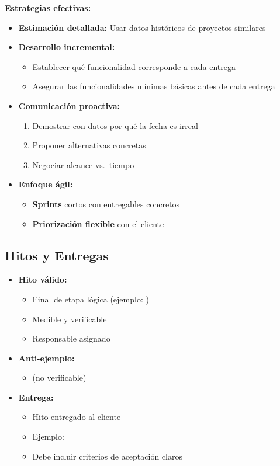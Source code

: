 \textbf{Estrategias efectivas:}

\begin{itemize}
    \item \textbf{Estimación detallada:} Usar datos históricos de proyectos similares
    \item \textbf{Desarrollo incremental:}
    \begin{itemize}
        \item Establecer qué funcionalidad corresponde a cada entrega
        \item Asegurar las funcionalidades mínimas básicas antes de cada entrega
    \end{itemize}
    \item \textbf{Comunicación proactiva:}
    \begin{enumerate}
        \item Demostrar con datos por qué la fecha es irreal
        \item Proponer alternativas concretas
        \item Negociar alcance vs.\ tiempo
    \end{enumerate}
    \item \textbf{Enfoque ágil:}
    \begin{itemize}
        \item \textbf{Sprints} cortos con entregables concretos
        \item \textbf{Priorización flexible} con el cliente
    \end{itemize}
\end{itemize}

\subsection{Hitos y Entregas}
\label{subsec:hitos}

\begin{itemize}
    \item \textbf{Hito válido:}
    \begin{itemize}
        \item Final de etapa lógica (ejemplo: )
        \item Medible y verificable
        \item Responsable asignado
    \end{itemize}
    \item \textbf{Anti-ejemplo:}
    \begin{itemize}
        \item {} (no verificable)
    \end{itemize}
    \item \textbf{Entrega:}
    \begin{itemize}
        \item Hito entregado al cliente
        \item Ejemplo: 
        \item Debe incluir criterios de aceptación claros
    \end{itemize}
\end{itemize}

